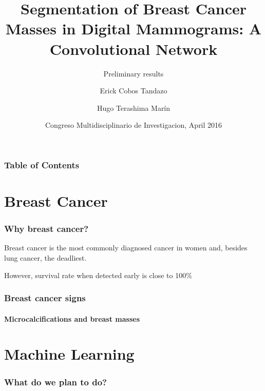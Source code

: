 \documentclass[12pt]{beamer}
\title[Convolutional Networks for Breast Cancer]{Segmentation of Breast Cancer Masses in Digital Mammograms: A
Convolutional Network}
\subtitle{Preliminary results}
\author[Cobos, Terashima] {Erick Cobos Tandazo\inst{1} \and Hugo Terashima Marín\inst{1}}
\date[April 2016]{Congreso Multidisciplinario de Investigacion, April 2016}
\institute[Tecnológico de Monterrey]{
	\inst{1} Sistemas Inteligentes \\ Instituto Tecnológico de Monterrey
}
\begin{document}
	\begin{frame}
		\titlepage
	\end{frame}
	
	\begin{frame}
		\frametitle{Table of Contents}
		\tableofcontents
	\end{frame}

	\section{Breast Cancer}
	\begin{frame}
		\frametitle{Why breast cancer?}
		
		Breast cancer is the most commonly diagnosed cancer in women and, besides lung cancer, the deadliest.
	
		However, survival rate when detected early is close to 100\%
	\end{frame}
	
	
	
	\begin{frame}
		\frametitle{Breast cancer signs}
		\framesubtitle{Microcalcifications and breast masses}
		
	\end{frame}
	
	

	\section{Machine Learning}
	\begin{frame}
		\frametitle{What do we plan to do?}
	\end{frame}
	
\end{document}
